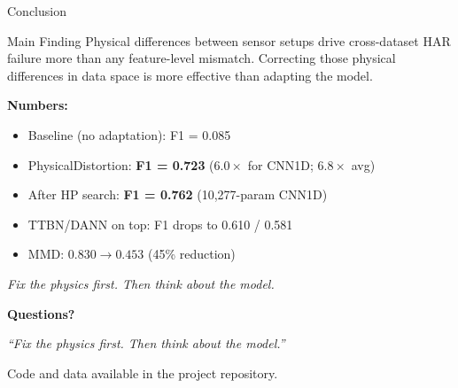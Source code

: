 \documentclass{beamer}
\begin{document}
\begin{frame}{Conclusion}

\begin{block}{Main Finding}
Physical differences between sensor setups drive cross-dataset HAR failure more than any feature-level mismatch. Correcting those physical differences in data space is more effective than adapting the model.
\end{block}

\bigskip
\textbf{Numbers:}
\begin{itemize}
    \item Baseline (no adaptation): F1 = 0.085
    \item PhysicalDistortion: \textbf{F1 = 0.723} ($6.0\times$ for CNN1D; $6.8\times$ avg)
    \item After HP search: \textbf{F1 = 0.762} (10{,}277-param CNN1D)
    \item TTBN/DANN on top: F1 drops to 0.610 / 0.581
    \item MMD: $0.830 \rightarrow 0.453$ (45\% reduction)
\end{itemize}

\bigskip
\textit{Fix the physics first. Then think about the model.}

\end{frame}

\begin{frame}{}
\begin{center}
{\Huge \textbf{Questions?}}

\bigskip\bigskip
\large
\textit{``Fix the physics first. Then think about the model.''}

\bigskip\bigskip
\normalsize
Code and data available in the project repository.
\end{center}
\end{frame}
\end{document}
